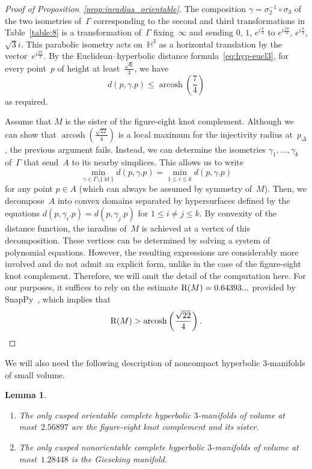 \documentclass[11pt,reqno]{amsart}
\newtheorem{lemma}[theorem]{Lemma}
\theoremstyle{definition}
\numberwithin{equation}{section}
\newcommand\C {{\mathbb C}}
\newcommand{\HH}{{\mathbb H}}
\newcommand\RR{{\rm R}}
\DeclareMathOperator{\arcosh}{arcosh}
\DeclareMathOperator{\id}{id}
\newcommand{\PSL}{{\rm PSL}}
\numberwithin{equation}{section}
\begin{document}
\begin{proof}[Proof of Proposition~\ref{prop:inradius_orientable}]
The composition $\gamma=\sigma_2^{-1} \circ \sigma_3$ of the two isometries of~$\Gamma$ corresponding to the second and third transformations in Table~\ref{table:8} is a transformation of~$\Gamma$ fixing~$\infty$ and sending $0$, $1$, $e^{i \frac{\pi}{3}}$ to $e^{i \frac{2 \pi}{3}}$, $e^{i \frac{\pi}{3}}$, $\sqrt{3} i$.
This parabolic isometry 
acts on~$\HH^3$ as a horizontal translation by the vector~$e^{i \frac{2 \pi}{3}}$.
By the Euclidean--hyperbolic distance formula~\eqref{eq:hyp-eucl3}, for every point~$p$ of height at least~$\frac{\sqrt{6}}{3}$, we have
\[
d(p,\gamma.p) \leq \arcosh \left( \frac{7}{4} \right)
\]
as required.

Assume that $M$ is the sister of the figure-eight knot complement.
Although we can show that  $\arcosh \left( \frac{\sqrt{22}}{4} \right)$ is a local maximum for the injectivity radius at~$p_\Delta$, the previous argument fails.
Instead, we can determine the isometries $\gamma_1,\dots,\gamma_k$ of~$\Gamma$ that send~$A$ to its nearby simplices.
This allows us to write 
\[
\min_{\gamma \in \Gamma \setminus \{ \id \}} d(p,\gamma.p) = \min_{1 \leq i \leq k} d(p,\gamma.p)
\]
for any point $p \in A$ (which can always be assumed by symmetry of~$M$).
Then, we decompose~$A$ into convex domains separated by hypersurfaces defined by the equations $d(p,\gamma_i.p) = d(p,\gamma_j.p)$ for $1 \leq i \neq j \leq k$.
By convexity of the distance function, the inradius of~$M$ is achieved at a vertex of this decomposition.
These vertices can be determined by solving a system of polynomial equations.
However, the resulting expressions are considerably more involved and do not admit an explicit form, unlike in the case of the figure-eight knot complement.
Therefore, we will omit the detail of the computation here.
For our purposes, it suffices to rely on the estimate $\RR(M) = 0.64393...$ provided by SnapPy~\cite{snappy}, which implies that 
\[
\RR(M) > \arcosh \left( \frac{\sqrt{22}}{4} \right).
\]
\end{proof}

We will also need the following description of noncompact hyperbolic $3$-manifolds of small volume.

\begin{lemma} \label{lem:2.56}
\mbox{ }
\begin{enumerate}
\item The only cusped orientable complete hyperbolic $3$-manifolds of volume at most~$2.56897$ are the figure-eight knot complement and its sister. \label{2.56i}
\item The only cusped nonorientable complete hyperbolic $3$-manifolds of volume at most~$1.28448$ is the Gieseking manifold. \label{2.56ii}
\end{enumerate}
\end{lemma}
\end{document}
